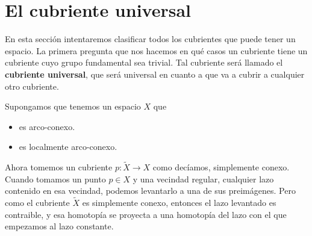 \documentclass[spanish]{book}
\theoremstyle{definition}
\newtheorem*{prop}{Proposición}
\begin{document}
\section{El cubriente universal}
En esta sección intentaremos clasificar todos los cubrientes que puede tener un espacio. La primera pregunta que nos hacemos en qué casos un cubriente tiene un cubriente cuyo grupo fundamental sea trivial. Tal cubriente será llamado el \textbf{cubriente universal}, que será universal en cuanto a que va a cubrir a cualquier otro cubriente.

Supongamos que tenemos un espacio $X$ que
\begin{itemize}
	\item es arco-conexo.
	\item es localmente arco-conexo.
\end{itemize}
Ahora tomemos un cubriente $p:\tilde{X}\to X$ como decíamos, simplemente conexo. Cuando tomamos un punto $p\in X$ y una vecindad regular, cualquier lazo contenido en esa vecindad, podemos levantarlo a una de sus preimágenes. Pero como el cubriente $\tilde{X}$ es simplemente conexo, entonces el lazo levantado es contraible, y esa homotopía se proyecta a una homotopía del lazo con el que empezamos al lazo constante.
\end{document}
